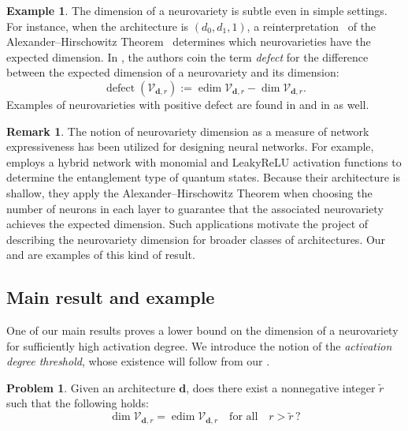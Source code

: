 \documentclass[12pt]{article}
\theoremstyle{definition}
\newtheorem{problem}[theorem]{Problem}
\newtheorem{example}[theorem]{Example}
\newtheorem{remark}[theorem]{Remark}
\DeclareMathOperator{\defect}{defect}
\newcommand{\bfd}{\mathbf{d}}
\newcommand{\demph}[1]{\emph{{\color{RoyalBlue}#1}}}
\newcommand{\edim}[1]{\operatorname{edim}{#1}}
\renewcommand{\dim}[1]{\operatorname{dim}{#1}}
\begin{document}
\begin{example}
    The dimension of a neurovariety is subtle even in  simple settings. 
    For instance, when the architecture is $(d_0,d_1,1)$, a reinterpretation~\cite[Theorem 9]{KTB2019} of the  
    {Alexander--Hirschowitz} Theorem~\cite{AH1995} determines which neurovarieties have the expected dimension.
    In \cite{KLW2024}, 
    the authors coin the term \emph{defect} for the difference between the expected dimension of a neurovariety and its dimension:
    {
\[
\defect(\mathcal{V}_{\bfd,r}):=
\edim{\mathcal{V}_{\bfd,r}}
-
\dim{\mathcal{V}_{\bfd,r}}.
\]  
    }%
Examples of neurovarieties
    with positive defect are found in 
    \cite[Table 1]{KLW2024} and in
    \cite{KTB2019} as well. 
\end{example}

\begin{remark}
    The notion of neurovariety dimension as a measure of network expressiveness has been utilized for designing neural networks. For example, \cite{Jaffali_2020} employs a hybrid network with monomial and LeakyReLU activation functions to determine the entanglement type of quantum states. Because their architecture is shallow, they apply the {Alexander--Hirschowitz} Theorem when choosing the number of neurons in each layer to guarantee that the associated neurovariety achieves the expected dimension.
Such applications motivate the project of describing the neurovariety dimension for broader classes of architectures. Our  and  are examples of this kind of result.
\end{remark}

\subsection{Main result and example}
One of our main results proves a lower bound on the dimension of a neurovariety for sufficiently high activation degree. 
We introduce the notion of the \demph{activation degree threshold}, whose existence will follow from our . 


\begin{problem}
\label{prob:threshold}
    Given an architecture $\mathbf{d}$,  
    does there exist a nonnegative integer $\tilde{r}$
    such that the following holds:
    \begin{equation}\label{eq:ActThr}
    \dim{\mathcal{V}_{\mathbf{d},r}}=\edim{\mathcal{V}_{\mathbf{d},r}}\quad \text{for all}\quad r>\tilde{r}\,?
    \end{equation}
\end{problem}
\end{document}
